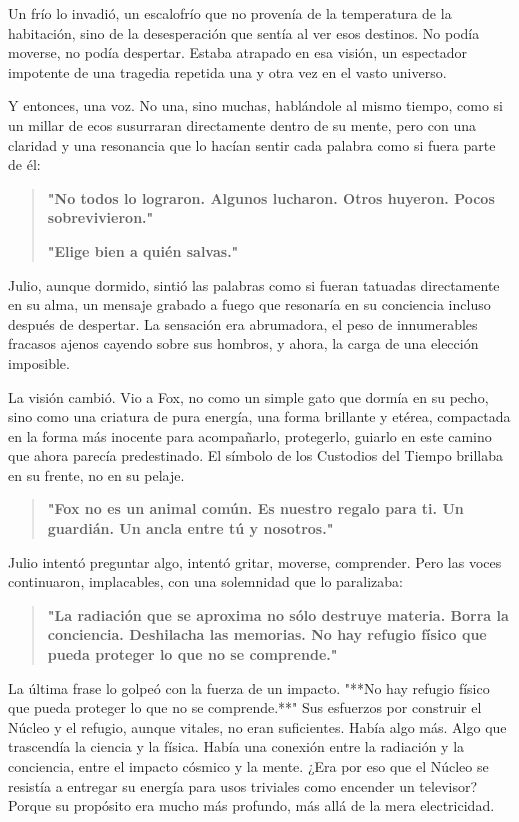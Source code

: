 \documentclass[a4paper,12pt]{book}
\begin{document}
Un frío lo invadió, un escalofrío que no provenía de la temperatura de la habitación, sino de la desesperación que sentía al ver esos destinos. No podía moverse, no podía despertar. Estaba atrapado en esa visión, un espectador impotente de una tragedia repetida una y otra vez en el vasto universo.

Y entonces, una voz. No una, sino muchas, hablándole al mismo tiempo, como si un millar de ecos susurraran directamente dentro de su mente, pero con una claridad y una resonancia que lo hacían sentir cada palabra como si fuera parte de él:

\begin{quote}
    \textbf{"No todos lo lograron. Algunos lucharon. Otros huyeron. Pocos sobrevivieron."}

    \textbf{"Elige bien a quién salvas."}
\end{quote}

Julio, aunque dormido, sintió las palabras como si fueran tatuadas directamente en su alma, un mensaje grabado a fuego que resonaría en su conciencia incluso después de despertar. La sensación era abrumadora, el peso de innumerables fracasos ajenos cayendo sobre sus hombros, y ahora, la carga de una elección imposible.

La visión cambió. Vio a Fox, no como un simple gato que dormía en su pecho, sino como una criatura de pura energía, una forma brillante y etérea, compactada en la forma más inocente para acompañarlo, protegerlo, guiarlo en este camino que ahora parecía predestinado. El símbolo de los Custodios del Tiempo brillaba en su frente, no en su pelaje.

\begin{quote}
    \textbf{"Fox no es un animal común. Es nuestro regalo para ti. Un guardián. Un ancla entre tú y nosotros."}
\end{quote}

Julio intentó preguntar algo, intentó gritar, moverse, comprender. Pero las voces continuaron, implacables, con una solemnidad que lo paralizaba:

\begin{quote}
    \textbf{"La radiación que se aproxima no sólo destruye materia. Borra la conciencia. Deshilacha las memorias. No hay refugio físico que pueda proteger lo que no se comprende."}
\end{quote}

La última frase lo golpeó con la fuerza de un impacto. "**No hay refugio físico que pueda proteger lo que no se comprende.**" Sus esfuerzos por construir el Núcleo y el refugio, aunque vitales, no eran suficientes. Había algo más. Algo que trascendía la ciencia y la física. Había una conexión entre la radiación y la conciencia, entre el impacto cósmico y la mente. ¿Era por eso que el Núcleo se resistía a entregar su energía para usos triviales como encender un televisor? Porque su propósito era mucho más profundo, más allá de la mera electricidad.
\end{document}
